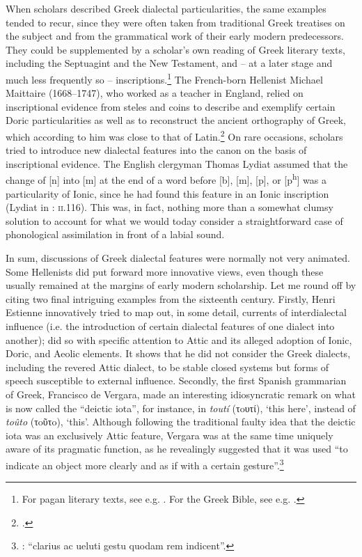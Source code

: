 When scholars described Greek dialectal particularities, the same examples tended to recur, since they were often taken from traditional Greek treatises on the subject and from the grammatical work of their early modern predecessors. They could be supplemented by a scholar’s own reading of Greek literary texts, including the Septuagint and the New Testament, and – at a later stage and much less frequently so – inscriptions.\footnote{For pagan literary texts, see e.g. \citet[]{Amerot1520, Amerot1530}. For the Greek Bible, see e.g. \citet{Pasor1632}.} The French-born Hellenist Michael Maittaire (1668–1747), who worked as a teacher in England, relied on inscriptional evidence from steles and coins to describe and exemplify certain Doric particularities as well as to reconstruct the ancient orthography of Greek, which according to him was close to that of Latin.\footnote{\citet[e.g. 161–167, 170, 184, 205–206, 211–212, 221, 240, 243]{Maittaire1706}.} On rare occasions, scholars tried to introduce new dialectal features into the canon on the basis of inscriptional evidence. The English clergyman Thomas Lydiat assumed that the change of [n] into [m] at the end of a word before [b], [m], [p], or [p\textsuperscript{h}] was a particularity of Ionic, since he had found this feature in an Ionic inscription (Lydiat in \citealt{Prideaux1676}: \textsc{ii}.116). This was, in fact, nothing more than a somewhat clumsy solution to account for what we would today consider a straightforward case of phonological assimilation in front of a labial sound.

In sum, discussions of Greek dialectal features were normally not very animated. Some Hellenists did put forward more innovative views, even though these usually remained at the margins of early modern scholarship. Let me round off by citing two final intriguing examples from the sixteenth century. Firstly, Henri Estienne innovatively tried to map out, in some detail, currents of interdialectal influence (i.e. the introduction of certain dialectal features of one dialect into another); \citet[22--28]{Estienne1581} did so with specific attention to Attic and its alleged adoption of Ionic, Doric, and Aeolic elements. It shows that he did not consider the Greek dialects, including the revered Attic dialect, to be stable closed systems but forms of speech susceptible to external influence. Secondly, the first Spanish grammarian of Greek, Francisco de Vergara, made an interesting idiosyncratic remark on what is now called the “deictic iota”, for instance, in \textit{toutí} (τoυτί), ‘this here’, instead of \textit{toûto} (τoῦτo), ‘this’. Although following the traditional faulty idea that the deictic iota was an exclusively Attic feature, Vergara was at the same time uniquely aware of its pragmatic function, as he revealingly suggested that it was used “to indicate an object more clearly and as if with a certain gesture”.\footnote{\citet[218]{Vergara1537}: “clarius ac ueluti gestu quodam rem indicent”.}

